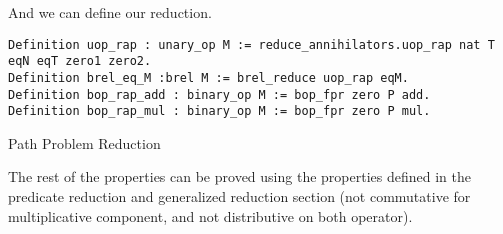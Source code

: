 And we can define our reduction.
\begin{listing}[H]
\begin{verbatim}
Definition uop_rap : unary_op M := reduce_annihilators.uop_rap nat T eqN eqT zero1 zero2.
Definition brel_eq_M :brel M := brel_reduce uop_rap eqM. 
Definition bop_rap_add : binary_op M := bop_fpr zero P add.
Definition bop_rap_mul : binary_op M := bop_fpr zero P mul.
\end{verbatim}
\caption{Path Problem Reduction} 
\label{coq:def:path_problem_Reduction}
\end{listing}

The rest of the properties can be proved using the properties defined in the predicate reduction and generalized reduction section (not commutative for multiplicative component, and not distributive on both operator).

